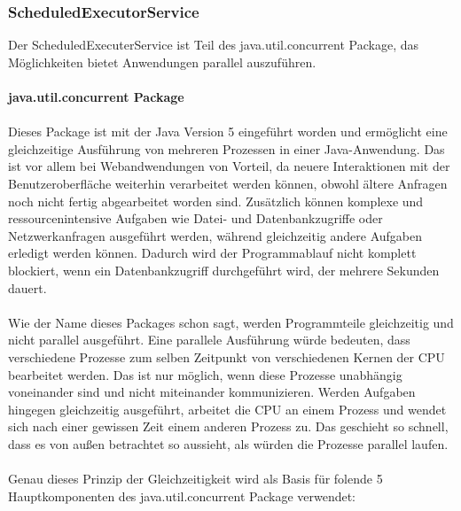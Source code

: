 \documentclass{report}
\begin{document}
\subsubsection{ScheduledExecutorService}
Der ScheduledExecuterService ist Teil des java.util.concurrent Package, das Möglichkeiten bietet Anwendungen parallel auszuführen.\\\\
\textbf{java.util.concurrent Package}\\\\
Dieses Package ist mit der Java Version 5 eingeführt worden und ermöglicht eine gleichzeitige Ausführung von mehreren Prozessen in einer Java-Anwendung. Das ist vor allem bei Webandwendungen von Vorteil, da neuere Interaktionen mit der Benutzeroberfläche weiterhin verarbeitet werden können, obwohl ältere Anfragen noch nicht fertig abgearbeitet worden sind. Zusätzlich können komplexe und ressourcenintensive Aufgaben wie Datei- und Datenbankzugriffe oder Netzwerkanfragen ausgeführt werden, während gleichzeitig andere Aufgaben erledigt werden können. Dadurch wird der Programmablauf nicht komplett blockiert, wenn ein Datenbankzugriff durchgeführt wird, der mehrere Sekunden dauert.\\\\
Wie der Name dieses Packages schon sagt, werden Programmteile gleichzeitig und nicht parallel ausgeführt. Eine parallele Ausführung würde bedeuten, dass verschiedene Prozesse zum selben Zeitpunkt von verschiedenen Kernen der CPU bearbeitet werden. Das ist nur möglich, wenn diese Prozesse unabhängig voneinander sind und nicht miteinander kommunizieren. Werden Aufgaben hingegen gleichzeitig ausgeführt, arbeitet die CPU an einem Prozess und wendet sich nach einer gewissen Zeit einem anderen Prozess zu. Das geschieht so schnell, dass es von außen betrachtet so aussieht, als würden die Prozesse parallel laufen.\\\\
Genau dieses Prinzip der Gleichzeitigkeit wird als Basis für folende 5 Hauptkomponenten des java.util.concurrent Package verwendet:
\end{document}
